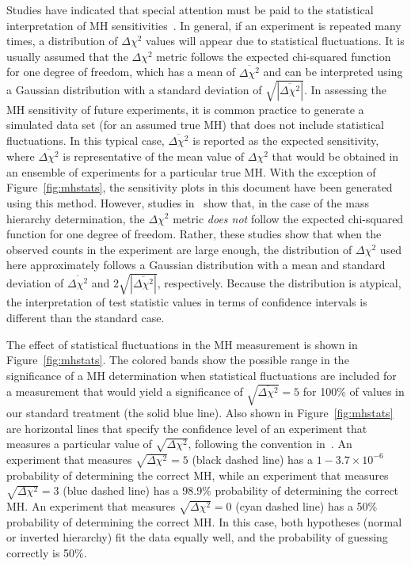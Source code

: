 Studies have indicated that special attention must be paid to the statistical interpretation of MH sensitivities~\cite{Qian:2012zn,Blennow:2013oma}.
In general, if an experiment is repeated many times, a distribution of $\Delta\chi^2$
values will appear due to statistical fluctuations.
It is usually assumed that the $\Delta \chi^2$ metric follows the expected chi-squared
function for one degree of freedom, which has a mean of
$\overline{\Delta\chi^2}$ and can be interpreted using a Gaussian
distribution with a standard deviation of
$\sqrt{|\overline{\Delta\chi^2}|}$.
In assessing the MH sensitivity of future experiments, it is common practice to generate
a simulated data set (for an assumed true MH) that does not include statistical fluctuations. 
In this typical case, $\overline{\Delta\chi^2}$ is reported as the expected sensitivity, 
where $\overline{\Delta\chi^2}$ is representative of the mean value of $\Delta\chi^2$ that 
would be obtained in an ensemble of experiments for a particular true MH.  
With the exception of Figure~\ref{fig:mhstats}, the sensitivity plots
in this document have been generated using this method.
However, studies in~\cite{Qian:2012zn,Blennow:2013oma}
show that, in the case of the mass hierarchy
determination, the $\Delta \chi^2$ metric {\em does not} follow the expected chi-squared
function for one degree of freedom.  Rather, these studies show that
when the observed counts in the experiment are large enough,
the distribution of $\Delta\chi^2$ used here approximately follows
a Gaussian distribution with a
mean and standard deviation of $\overline{\Delta\chi^2}$ and
$2\sqrt{|\overline{\Delta\chi^2}|}$, respectively. Because the distribution is atypical, the interpretation of 
test statistic values in terms of confidence intervals is different than the standard case.

The effect of statistical fluctuations in the MH measurement is shown in Figure~\ref{fig:mhstats}.  The colored bands show
the possible range in the significance of a MH determination when statistical
fluctuations are included for a measurement that would yield a significance of $\sqrt{\overline{\Delta\chi^{2}}} = 5$
for 100\% of \deltacp values in our standard treatment (the solid blue line).  Also shown in 
Figure~\ref{fig:mhstats} are horizontal lines that specify the confidence level of an experiment that measures a particular
value of $\sqrt{\Delta \chi^2}$, following the convention in~\cite{Qian:2012zn}. An experiment that measures
$\sqrt{\Delta \chi^2} = 5$ (black dashed line) has a $1 - 3.7\times10^{-6}$ probability of determining the
correct MH, while an experiment that measures$\sqrt{\Delta \chi^2} = 3$ (blue dashed line) has a 98.9\% 
probability of determining the correct MH. An experiment that measures $\sqrt{\Delta \chi^2} = 0$ (cyan dashed line)
has a 50\% probability of determining the correct MH.  In this case, both hypotheses (normal or inverted hierarchy) 
fit the data equally well, and the probability of guessing correctly is 50\%.

